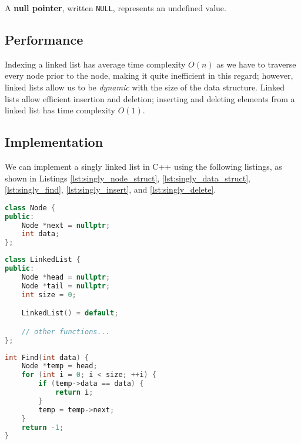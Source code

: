 \begin{definition}
    A \textbf{null pointer}, written \texttt{NULL}, represents an undefined value.
\end{definition}

\subsection{Performance}

Indexing a linked list has average time complexity $O(n)$ as we have to traverse every node prior to the node, making it quite inefficient in this regard; however, linked lists allow us to be \emph{dynamic} with the size of the data structure. Linked lists allow efficient insertion and deletion; inserting and deleting elements from a linked list has time complexity $O(1)$.

\subsection{Implementation}

We can implement a singly linked list in C++ using the following listings, as shown in Listings \ref{lst:singly_node_struct}, \ref{lst:singly_data_struct}, \ref{lst:singly_find}, \ref{lst:singly_insert}, and \ref{lst:singly_delete}.

\begin{lstlisting}[float,
                  language = C++,
                  caption = {Node data structure for singly linked list in C++.},
                  label = lst:singly_node_struct]
class Node {
public:
    Node *next = nullptr;
    int data;
};
\end{lstlisting}

\begin{lstlisting}[float,
                  language = C++,
                  caption = {Singly linked list data structure in C++.},
                  label = lst:singly_data_struct]
class LinkedList {
public:
    Node *head = nullptr;
    Node *tail = nullptr;
    int size = 0;

    LinkedList() = default;

    // other functions...
};
\end{lstlisting}

\begin{lstlisting}[float,
                  language = C++,
                  caption = {Find function for singly linked list in C++.},
                  label = lst:singly_find]
int Find(int data) {
    Node *temp = head;
    for (int i = 0; i < size; ++i) {
        if (temp->data == data) {
            return i;
        }
        temp = temp->next;
    }
    return -1;
}
\end{lstlisting}

